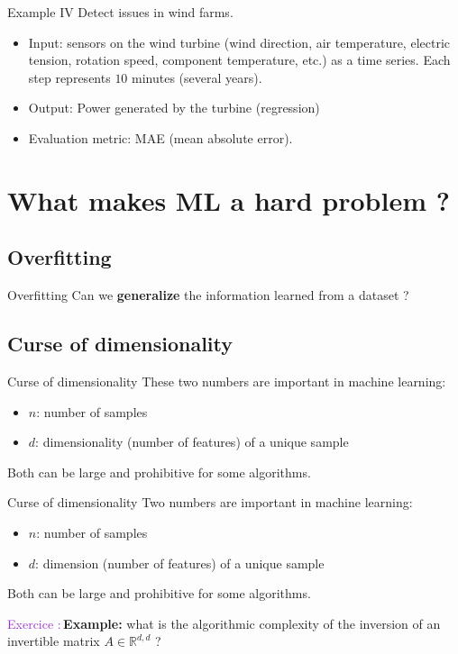 \documentclass[usenames,dvipsnames]{beamer}
\newcounter{numexos}%
\newcommand{\exercice}[1]{%
\addtocounter{numexos}{1}%
\textcolor{DarkOrchid}{Exercice\,\thenumexos\,:}\,#1%
}
\begin{document}
\begin{frame}{Example IV}
    Detect issues in wind farms.
    \begin{itemize}
        \item Input: sensors on the wind turbine (wind direction, air
            temperature, electric tension, rotation speed, component
            temperature, etc.) as a time series. Each step represents $10$
            minutes (several years).
        \item Output: Power generated by the turbine (regression)
        \item Evaluation metric: MAE (mean absolute error).
    \end{itemize}
    
\end{frame}


\section{What makes ML a hard problem ?}
\frame{\tableofcontents[currentsection]}

\subsection{Overfitting}

\begin{frame}{Overfitting}
    Can we \textbf{generalize} the information learned from a dataset ?
\end{frame}

\subsection{Curse of dimensionality}%
\label{sub:curse_of_dimensionality}

\begin{frame}{Curse of dimensionality}
   These two numbers are important in machine learning:
    \begin{itemize}
        \item $n$: number of samples
        \item $d$: dimensionality (number of features) of a unique sample
    \end{itemize}

    Both can be large and prohibitive for some algorithms.
\end{frame}

\begin{frame}{Curse of dimensionality}
   Two numbers are important in machine learning:
    \begin{itemize}
        \item $n$: number of samples
        \item $d$: dimension (number of features) of a unique sample
    \end{itemize}

    Both can be large and prohibitive for some algorithms.

    \exercice{\textbf{Example:}} what is the algorithmic complexity of the
    inversion of an invertible matrix $A\in \mathbb{R}^{d, d}$ ?
\end{frame}
\end{document}
